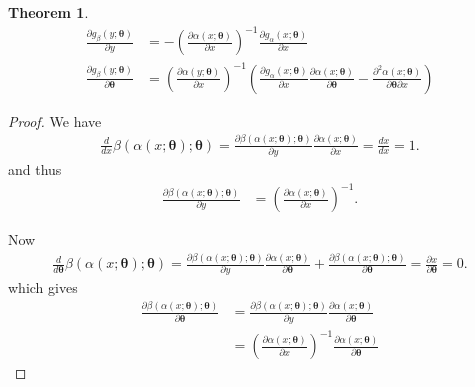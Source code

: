 \documentclass{article}
\newtheorem{theorem}{Theorem}
\begin{document}
\begin{theorem}
\begin{align}
    \frac{\partial g_{\beta}(y; \bm \theta)}{\partial y} &= - \left(\frac{\partial \alpha(x; \bm \theta)}{\partial x}\right)^{-1} \frac{\partial g_{\alpha}(x; \bm \theta)}{\partial x} \label{eq:grad-density-in} \\
    \frac{\partial g_{\beta}(y; \bm \theta)}{\partial \bm \theta} &= \left(\frac{\partial \alpha(y; \bm \theta)}{\partial x}\right)^{-1} \left(  \frac{\partial g_{\alpha}(x; \bm \theta)}{\partial x} \frac{\partial \alpha(x; \bm \theta)}{\partial \bm \theta} - \frac{\partial^{2} \alpha(x; \bm \theta)}{\partial \bm \theta \partial x} \right) \label{eq:grad-density-param}
\end{align}
\end{theorem}
\begin{proof}
    We have
    \begin{align}
        \frac{d}{d x} \beta(\alpha(x; \bm \theta); \bm \theta) = \frac{\partial \beta(\alpha(x; \bm \theta); \bm \theta)}{\partial y} \frac{\partial \alpha(x; \bm \theta)}{\partial x} = \frac{d x}{d x} = 1.
    \end{align}
    and thus
    \begin{align}
        \frac{\partial \beta(\alpha(x; \bm \theta); \bm \theta)}{\partial y}  &= \left( \frac{\partial \alpha(x; \bm \theta)}{\partial x} \right)^{-1}.
    \end{align}
    
    Now 
    \begin{align}
        \frac{d}{d \bm \theta} \beta(\alpha(x; \bm \theta); \bm \theta) = \frac{\partial \beta(\alpha(x; \bm \theta); \bm \theta)}{\partial y} \frac{\partial \alpha(x; \bm \theta)}{\partial \bm \theta} + \frac{\partial \beta(\alpha(x; \bm \theta); \bm \theta)}{\partial \bm \theta} = \frac{\partial x}{\partial \bm \theta} = 0.
    \end{align}
    which gives
    \begin{align}
        \frac{\partial \beta(\alpha(x; \bm \theta); \bm \theta)}{\partial \bm \theta} 
        &= \frac{\partial \beta(\alpha(x; \bm \theta); \bm \theta)}{\partial y} \frac{\partial \alpha(x; \bm \theta)}{\partial \bm \theta}\\
        &= \left( \frac{\partial \alpha(x; \bm \theta)}{\partial x} \right)^{-1} \frac{\partial \alpha(x; \bm \theta)}{\partial \bm \theta}
    \end{align}
    

\end{proof}
\end{document}
